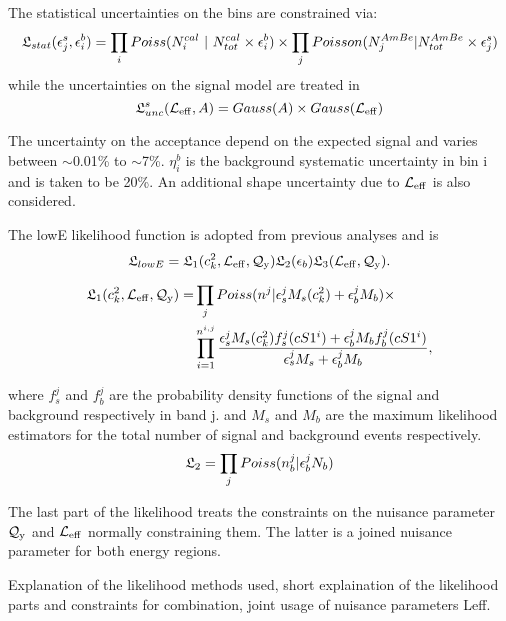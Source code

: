 The statistical uncertainties on the bins are constrained via:
\begin{equation}
\label{eq:LstsatHighE}
\mathfrak{L}_{stat}(\epsilon^{s}_{j},\epsilon^{b}_{i}) = \prod_{i}Poiss(N_i^{cal}~|~N_{tot}^{cal} \times \epsilon^{b}_{i}) \times \prod_j Poisson(N_j^{AmBe} | N_{tot}^{AmBe} \times \epsilon^{s}_{j})
\end{equation}
while the uncertainties on the signal model are treated in 
\begin{equation}
\mathfrak{L}^s_{unc}(\mathcal{L}_{\mathrm{eff}}, A) = Gauss(A) \times Gauss(\mathcal{L}_{\mathrm{eff}})
\end{equation}

The uncertainty on the acceptance depend on the expected signal and varies between $\sim$0.01\% to $\sim$7\%. $\eta^{b}_{i}$ is the background systematic uncertainty in bin i and is taken to be 20\%. An additional shape uncertainty due to $\mathcal{L}_{\mathrm{eff}}$ is also considered.   

The lowE likelihood function is adopted from previous analyses and is \begin{equation}
\label{eq:LowELikelihood}
\mathfrak{L}_{lowE} = \mathfrak{L}_1(c_k^2,\mathcal{L}_{\mathrm{eff}},\mathcal{Q}_{\mathrm{y}}) \mathfrak{L}_2(\epsilon_b) \mathfrak{L}_3(\mathcal{L}_{\mathrm{eff}},\mathcal{Q}_{\mathrm{y}}) .
\end{equation}

\begin{equation} \label{eq:LowELikelihood1}
\begin{split}
\mathfrak{L}_1(c_k^2,\mathcal{L}_{\mathrm{eff}},\mathcal{Q}_{\mathrm{y}}) = &\prod_j Poiss(n^j|\epsilon_s^jM_s(c_k^2)+\epsilon_b^jM_b) \times  \\
&\prod_{i=1}^{n^{i,j}} \frac{\epsilon_s^j M_s(c_k^2)f_s^j(cS1^i) + \epsilon_b^j M_bf_b^j(cS1^i)}{\epsilon^j_sM_s + \epsilon^j_bM_b} ,
\end{split}
\end{equation}

where $f^j_s$ and $f^j_b$ are the probability density functions of the signal and background respectively in band j. and $M_s$ and $M_b$ are the maximum likelihood estimators for the total number of signal and background events respectively.
\begin{equation}
\mathfrak{L}_2 = \prod_j Poiss(n^j_b | \epsilon_b^jN_b)
\end{equation} 

The last part of the likelihood treats the constraints on the nuisance parameter $\mathcal{Q}_{\mathrm{y}}$ and $\mathcal{L}_{\mathrm{eff}}$ normally constraining them. The latter is a joined nuisance parameter for both energy regions. 


Explanation of the likelihood methods used, short explaination of the likelihood parts and constraints for combination, joint usage of nuisance parameters {Leff}.




